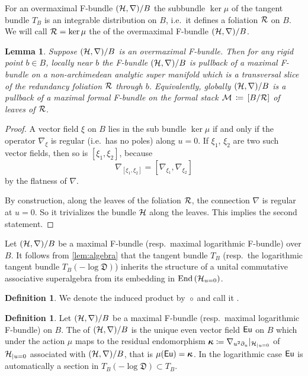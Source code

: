 \documentclass[twoside,leqno]{article}
\numberwithin{equation}{section}
\theoremstyle{plain}
\newtheorem{lemma}[equation]{Lemma}
\theoremstyle{definition}
\newtheorem{definition}[equation]{Definition}
\begin{document}
For an overmaximal F-bundle $(\mathcal H, \nabla)/B$ the subbundle $\ker\mu$ of the tangent bundle $T_{B}$ is an integrable distribution on $B$, i.e.~it defines a foliation $\mathcal R$ on $B$. We will call $\mathcal R = \ker \mu$ the  of the overmaximal F-bundle $(\mathcal H, \nabla)/B$.

\begin{lemma} \label{lem:foliation}
Suppose $(\mathcal H, \nabla)/B$ is an overmaximal F-bundle. Then for any rigid point $b \in B$, locally near $b$ the F-bundle $(\mathcal H, \nabla)/B$ is pullback of a maximal F-bundle on a non-archimedean analytic super manifold which is a transversal slice of the redundancy foliation $\mathcal R$ through $b$.  Equivalently, globally $(\mathcal H, \nabla)/B$  is a pullback of a maximal formal F-bundle on the formal stack $\mathcal M \, \coloneqq \, [B/\mathcal R]$ of leaves of $\mathcal R$.
\end{lemma}

\begin{proof}
  A vector field $\xi$ on $B$ lies in the sub bundle $\ker\mu$ if and only if the operator $\nabla_\xi$ is regular (i.e.\ has no poles) along $u=0$.
  If $\xi_1$, $\xi_2$ are two such vector fields, then so is $[\xi_1,\xi_2]$, because
  \[
  \nabla_{[\xi_1,\xi_2]}=[\nabla_{\xi_1},\nabla_{\xi_2}]
  \]
  by the flatness of $\nabla$.

  By construction, along the leaves of the foliation $\mathcal R$, the connection $\nabla$ is regular at $u=0$.
  So it trivializes the bundle $\mathcal H$ along the leaves.
  This implies the second statement.
\end{proof}

Let $(\mathcal H,\nabla)/B$ be a maximal F-bundle (resp.\ maximal logarithmic F-bundle) over $B$.
It follows from \cref{lem:algebra} that the tangent bundle $T_{B}$ (resp.\ the logarithmic tangent bundle $T_{B}(-\log \mathfrak{D})$) inherits 
the structure of a unital commutative associative superalgebra from its embedding 
in $\operatorname{End}\left(\mathcal H_{u=0}\right)$. 

\begin{definition} \label{def:maxFfp}
We denote the induced product by~$\circ$ and call it .
\end{definition}

\begin{definition} \label{def-euler} 
Let $(\mathcal H, \nabla)/B$ be a maximal F-bundle (resp.\ maximal logarithmic F-bundle) on $B$. The
 of $(\mathcal H, \nabla)/B$ is the unique
even vector field $\operatorname{\mathsf{Eu}}$ on $B$ which under the action $\mu$ maps to
the residual endomorphism $\boldsymbol{\kappa} \coloneqq \nabla_{u^2\partial_{u}}|_{\mathcal H_{|u=0}}$ of $\mathcal H_{|u=0}$ associated with $(\mathcal H, \nabla)/B$, that is $\mu(\operatorname{\mathsf{Eu}}) = \boldsymbol{\kappa}$. In the logarithmic case  $\operatorname{\mathsf{Eu}}$ is automatically a section in $T_{B}(-\log \mathfrak{D}) \subset T_{B}$. 
\end{definition}
\end{document}
